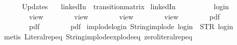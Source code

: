 \begin{isabellebody}
\ \ \ \ \ \ Updates\ {\isacharequal}\ {\isacharbrackleft}{\isacharbrackright}\isanewline
{\isasymrparr}{\isachardoublequoteclose}\isanewline
\isanewline
{}\isamarkupfalse%
\ {\isachardoublequoteopen}linkedIn{\isachardoublequoteclose}\ {\isacharcolon}{\isacharcolon}\ {\isachardoublequoteopen}transition{\isacharunderscore}matrix{\isachardoublequoteclose}\ \isanewline
{\isachardoublequoteopen}linkedIn\ {\isasymequiv}\ {\isacharbraceleft}{\isacharbar}\isanewline
\ \ \ \ \ \ {\isacharparenleft}{\isacharparenleft}{}{\isacharcomma}\ {}{\isacharparenright}{\isacharcomma}\ login{\isacharparenright}{\isacharcomma}\isanewline
\ \ \ \ \ \ {\isacharparenleft}{\isacharparenleft}{}{\isacharcomma}\ {}{\isacharparenright}{\isacharcomma}\ view{\isacharparenright}{\isacharcomma}\isanewline
\ \ \ \ \ \ {\isacharparenleft}{\isacharparenleft}{}{\isacharcomma}\ {}{\isacharparenright}{\isacharcomma}\ view{}{\isacharparenright}{\isacharcomma}\isanewline
\ \ \ \ \ \ {\isacharparenleft}{\isacharparenleft}{}{\isacharcomma}\ {}{\isacharparenright}{\isacharcomma}\ view{}{\isacharparenright}{\isacharcomma}\isanewline
\ \ \ \ \ \ {\isacharparenleft}{\isacharparenleft}{}{\isacharcomma}\ {}{\isacharparenright}{\isacharcomma}\ view{}{\isacharparenright}{\isacharcomma}\isanewline
\ \ \ \ \ \ {\isacharparenleft}{\isacharparenleft}{}{\isacharcomma}\ {}{\isacharparenright}{\isacharcomma}\ pdf{\isacharparenright}{\isacharcomma}\isanewline
\ \ \ \ \ \ {\isacharparenleft}{\isacharparenleft}{}{\isacharcomma}\ {}{\isacharparenright}{\isacharcomma}\ pdf{}{\isacharparenright}{\isacharcomma}\isanewline
\ \ \ \ \ \ {\isacharparenleft}{\isacharparenleft}{}{\isacharcomma}\ {}{\isacharparenright}{\isacharcomma}\ pdf{}{\isacharparenright}\isanewline
{\isacharbar}{\isacharbraceright}{\isachardoublequoteclose}\isanewline
\isanewline
{}\isamarkupfalse%
\ implode{\isacharunderscore}login{\isacharcolon}\ {\isachardoublequoteopen}String{\isachardot}implode\ {\isacharprime}{\isacharprime}login{\isacharprime}{\isacharprime}\ {\isacharequal}\ STR\ {\isacharprime}{\isacharprime}login{\isacharprime}{\isacharprime}{\isachardoublequoteclose}\isanewline
%
\isadelimproof
\ \ %
\endisadelimproof
%
\isatagproof
{}\isamarkupfalse%
\ {\isacharparenleft}metis\ Literal{\isachardot}rep{\isacharunderscore}eq\ String{\isachardot}implode{\isacharunderscore}explode{\isacharunderscore}eq\ zero{\isacharunderscore}literal{\isachardot}rep{\isacharunderscore}eq{\isacharparenright}%

\end{isabellebody}
